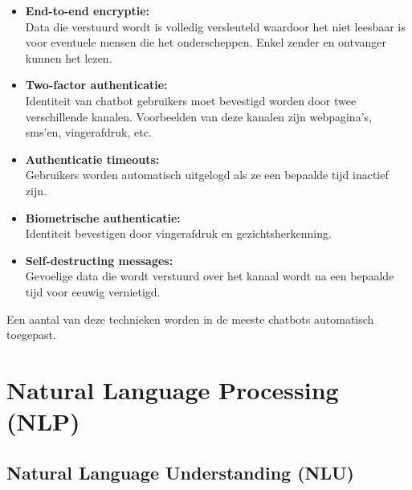 \begin{itemize}
    \item \textbf{End-to-end encryptie:} \\
    
    Data die verstuurd wordt is volledig versleuteld waardoor het niet leesbaar is voor eventuele mensen die het onderscheppen. Enkel zender en ontvanger kunnen het lezen. \\
    
    \item \textbf{Two-factor authenticatie:} \\
    
    Identiteit van chatbot gebruikers moet bevestigd worden door twee verschillende kanalen. Voorbeelden van deze kanalen zijn webpagina’s, sms’en, vingerafdruk, etc. \\
    
    \item \textbf{Authenticatie timeouts:} \\
    
    Gebruikers worden automatisch uitgelogd als ze een bepaalde tijd inactief zijn. \\
    
    \item \textbf{Biometrische authenticatie:} \\
    
    Identiteit bevestigen door vingerafdruk en gezichtsherkenning. \\
    
    \item \textbf{Self-destructing messages:} \\
    
    Gevoelige data die wordt verstuurd over het kanaal wordt na een bepaalde tijd voor eeuwig vernietigd. \\
\end{itemize}

Een aantal van deze technieken worden in de meeste chatbots automatisch toegepast.


\section{Natural Language Processing (NLP)}
\label{sec:nlp}

\subsection{Natural Language Understanding (NLU)}
\label{subsec:nlp-nlu}

